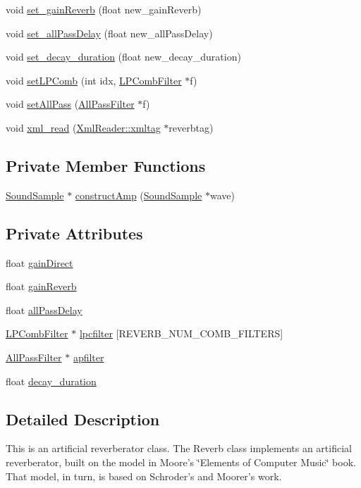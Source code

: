 \begin{CompactItemize}
\item 
void \hyperlink{classReverb_a14}{set\_\-gain\-Reverb} (float new\_\-gain\-Reverb)
\item 
void \hyperlink{classReverb_a15}{set\_\-all\-Pass\-Delay} (float new\_\-all\-Pass\-Delay)
\item 
void \hyperlink{classReverb_a16}{set\_\-decay\_\-duration} (float new\_\-decay\_\-duration)
\item 
void \hyperlink{classReverb_a17}{set\-LPComb} (int idx, \hyperlink{classLPCombFilter}{LPComb\-Filter} $\ast$f)
\item 
void \hyperlink{classReverb_a18}{set\-All\-Pass} (\hyperlink{classAllPassFilter}{All\-Pass\-Filter} $\ast$f)
\item 
void \hyperlink{classReverb_a19}{xml\_\-read} (\hyperlink{classXmlReader_1_1xmltag}{Xml\-Reader::xmltag} $\ast$reverbtag)
\end{CompactItemize}
\subsection*{Private Member Functions}
\begin{CompactItemize}
\item 
\hyperlink{classSoundSample}{Sound\-Sample} $\ast$ \hyperlink{classReverb_d0}{construct\-Amp} (\hyperlink{classSoundSample}{Sound\-Sample} $\ast$wave)
\end{CompactItemize}
\subsection*{Private Attributes}
\begin{CompactItemize}
\item 
float \hyperlink{classReverb_r0}{gain\-Direct}
\item 
float \hyperlink{classReverb_r1}{gain\-Reverb}
\item 
float \hyperlink{classReverb_r2}{all\-Pass\-Delay}
\item 
\hyperlink{classLPCombFilter}{LPComb\-Filter} $\ast$ \hyperlink{classReverb_r3}{lpcfilter} \mbox{[}REVERB\_\-NUM\_\-COMB\_\-FILTERS\mbox{]}
\item 
\hyperlink{classAllPassFilter}{All\-Pass\-Filter} $\ast$ \hyperlink{classReverb_r4}{apfilter}
\item 
float \hyperlink{classReverb_r5}{decay\_\-duration}
\end{CompactItemize}


\subsection{Detailed Description}
This is an artificial reverberator class. The Reverb class implements an artificial reverberator, built on the model in Moore's \char`\"{}Elements of Computer Music\char`\"{} book. That model, in turn, is based on Schroder's and Moorer's work.

